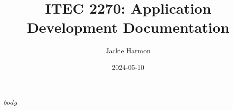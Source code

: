 \documentclass[11pt]{article}
\title{ITEC 2270: Application Development Documentation}
\author{Jackie Harmon}
\date{2024-05-10}
\begin{document}
\maketitle
\newpage %

\tableofcontents
\newpage %

\providecommand{\tightlist}{%
  \setlength{\itemsep}{0pt}\setlength{\parskip}{0pt}}

$body$
\end{document}
